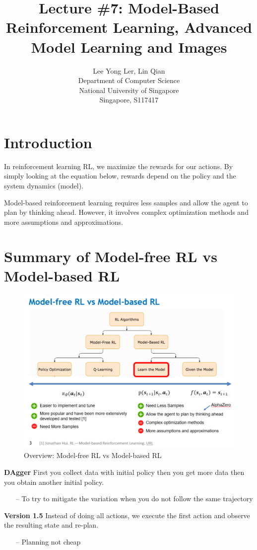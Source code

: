 \documentclass{article}
\title{Lecture \#7: Model-Based Reinforcement Learning, Advanced Model Learning and Images}
\author{
  Lee Yong Ler, Lin Qian \\
  Department of Computer Science\\
  National University of Singapore\\
  Singapore, S117417 \\
}
\begin{document}
\maketitle


\section{Introduction}
In reinforcement learning RL, we maximize the rewards for our actions. By simply looking at the equation below, rewards depend on the policy and the system dynamics (model).

Model-based reinforcement learning requires less samples and allow the agent to plan by thinking ahead. However, it involves complex optimization methods and more assumptions and approximations.

\section{Summary of Model-free RL vs Model-based RL}

\begin{figure}[h]
    \centering
        \includegraphics[width=0.8\linewidth]{img/vs.png}
    \caption{Overview: Model-free RL vs Model-based RL}
    \label{fig:vs}
\end{figure}

\noindent\textbf{DAgger} First you collect data with initial policy then you get more data then you obtain another initial policy.
\begin{itemize}
\item[--] To try to mitigate the variation when you do not follow the same trajectory
\end{itemize}

\noindent\textbf{Version 1.5} Instead of doing all actions, we execute the first action and observe the resulting state and re-plan.
\begin{itemize}
\item[--] Planning not cheap
\end{itemize}
\end{document}

